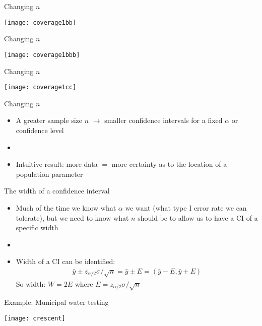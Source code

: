 \documentclass[xcolor=dvipsnames]{beamer}
\begin{document}
\begin{frame}{Changing $n$}
\begin{center}
	\texttt{[image: coverage1bb]}
\end{center}
\end{frame}

\begin{frame}{Changing $n$}
\begin{center}
	\texttt{[image: coverage1bbb]}
\end{center}
\end{frame}

\begin{frame}{Changing $n$}
\begin{center}
	\texttt{[image: coverage1cc]}
\end{center}
\end{frame}

\begin{frame}{Changing $n$}
\begin{itemize}
		\item A greater sample size $n$ $\rightarrow$ smaller confidence intervals for a fixed $\alpha$ or confidence level
	\item[]
	\item Intuitive result: more data $=$ more certainty as to the location of a population parameter
\end{itemize}
\end{frame}

\begin{frame}{The width of a confidence interval}
	\begin{itemize}
		\item Much of the time we know what $\alpha$ we want (what type I error rate we can tolerate), but we need to know what $n$ should be to allow us to have a CI of a specific width
		\item[]
		\item Width of a CI can be identified:
		\begin{align*}
			\bar{y}\pm z_{\alpha/2} \sigma / \sqrt{n} = \bar{y} \pm E = (\bar{y}-E, \bar{y}+E)
		\end{align*}
		So width: $W = 2E$ where $E = z_{\alpha/2} \sigma  /\sqrt{n}$
	\end{itemize}
\end{frame}

\begin{frame}{Example: Municipal water testing}
	\begin{center}
		\texttt{[image: crescent]}
	\end{center}
\end{frame}
\end{document}

